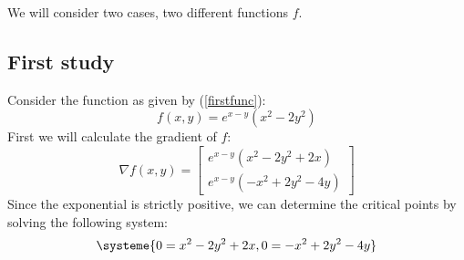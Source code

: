\documentclass[../convex_optimization.tex]{subfiles}
\begin{document}
We will consider two cases, two different functions $f$.
\subsection{First study}
Consider the function as given by (\ref{firstfunc}):
\begin{equation}
    f(x, y)=e^{x-y} (x^2 - 2y^2)
    \label{firstfunc}
\end{equation}
First  we will calculate the gradient of $f$:
\begin{equation}
    \nabla f(x,y) = 
    \begin{bmatrix}
    e^{x-y} (x^2 - 2y^2 + 2x) \\
    e^{x-y} (-x^2 + 2y^2 - 4y)
    \end{bmatrix}
    \label{firstgrad}
\end{equation}
Since the exponential is strictly positive, we can determine the critical points by solving the following system:
\begin{equation}
    \systeme{0 = x^2 - 2y^2 + 2x,0 = -x^2 + 2y^2 - 4y}
    \label{firstsystem}
\end{equation}
\end{document}
